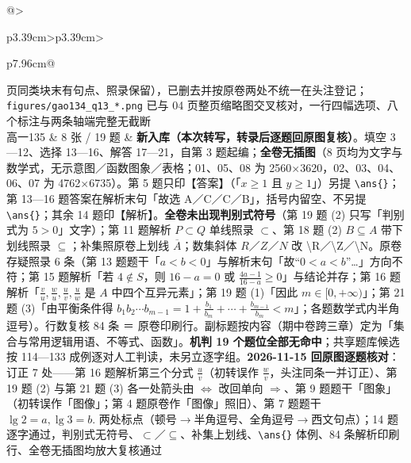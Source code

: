 \documentclass[a4paper,11pt]{article}
\begin{document}
\begin{xltabular}{\textwidth}{@{}>{\raggedright\arraybackslash}p{3.39cm}>{\centering\arraybackslash}p{3.39cm}>{\raggedright\arraybackslash}p{7.96cm}@{}}
页同类块末有句点、照录保留），已删去并按原卷两处不统一在头注登记；\texttt{figures/\allowbreak{}gao134\_q13\_*.png} 已与 04 页整页缩略图交叉核对，一行四幅选项、八个标注与两条轴端完整无截断 \\ \addlinespace[1pt]
高一135 & 8 张 / 19 题 & \textbf{新入库（本次转写，转录后逐题回原图复核）}。填空 3---12、选择 13---16、解答 17---21，自第 3 题起编；\textbf{全卷无插图}（8 页均为文字与数学式，无示意图／函数图象／表格；01、05、08 为 2560$\times$3620，02、03、04、06、07 为 4762$\times$6735）。第 5 题只印【答案】（「\(x\geq1\) 且 \(y\geq1\)」）另提 \texttt{\textbackslash{}ans\{\}}；第 13---16 题答案在解析末句「故选 A／C／C／B」，括号内留空、不另提 \texttt{\textbackslash{}ans\{\}}；其余 14 题印【解析】。\textbf{全卷未出现判别式符号}（第 19 题 (2) 只写「判别式为 \(5>0\)」文字）；第 11 题解析 \(P\subset\allowbreak  Q\) 单线照录 \(\subset\allowbreak \)、第 18 题 (2) \(B\subseteq\allowbreak  A\) 带下划线照录 \(\subseteq\allowbreak \)；补集照原卷上划线 \(\overline{A}\)；数集斜体 \(R\)／\(Z\)／\(N\) 改 \textbackslash R／\textbackslash Z／\textbackslash N。原卷存疑照录 6 条（第 13 题题干「\(a<b<0\)」与解析末句「故``\(0<a<b\)''\ldots」方向不符；第 15 题解析「若 \(4\notin S\)，则 \(16-a=\allowbreak 0\) 或 \(\frac{4a-1}{16-a}\geq0\)」与结论并存；第 16 题解析「\(\frac vu,\allowbreak \frac wu,\allowbreak \frac uv,\allowbreak \frac uw\) 是 \(A\) 中四个互异元素」；第 19 题 (1)「因此 \(m\in[0,\allowbreak +\allowbreak \infty)\)」；第 21 题 (3)「由平衡条件得 \(b_1b_2\cdots b_{m-1}=\allowbreak 1+\allowbreak \frac{b_1}{b_m}+\allowbreak \cdots+\allowbreak \frac{b_{m-1}}{b_m}<m\)」；各题数学式内半角逗号）。行数复核 84 条 ＝ 原卷印刷行。副标题按内容（期中卷跨三章）定为「集合与常用逻辑用语、不等式、函数」。\textbf{机判 19 个题位全部无命中}；共享题库候选按 114---133 成例逐对人工判读，未另立逐字组。\textbf{2026-11-15 回原图逐题核对}：订正 7 处------第 16 题解析第三个分式 \(\frac uv\)（初转误作 \(\frac wv\)，头注同条一并订正）、第 19 题 (2) 与第 21 题 (3) 各一处箭头由 \(\Leftrightarrow\) 改回单向 \(\Rightarrow\)、第 9 题题干「图象」（初转误作「图像」；第 4 题原卷作「图像」照旧）、第 7 题题干 \(\lg 2=a,\allowbreak \lg 3=b\). 两处标点（顿号$\to$半角逗号、全角逗号$\to$西文句点）；14 题逐字通过，判别式无符号、\(\subset\allowbreak \)／\(\subseteq\allowbreak \)、补集上划线、\texttt{\textbackslash{}ans\{\}} 体例、84 条解析印刷行、全卷无插图均放大复核通过 \\ \addlinespace[1pt]

\end{xltabular}
\end{document}
